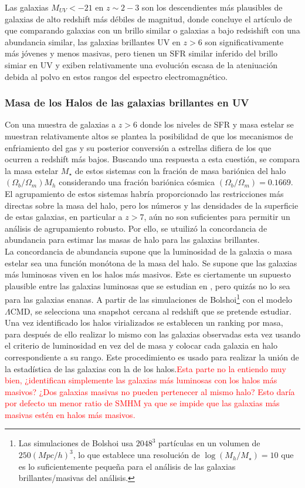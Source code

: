 \documentclass{article}
\begin{document}
Las galaxias $M_{UV}<-21$ en $z\sim 2-3$ son los descendientes más plausibles de galaxias de alto redshift más débiles de magnitud, donde concluye el artículo de \cite{finkelstein2015increasing} que comparando galaxias con un brillo similar o galaxias a bajo redsishift con una abundancia similar, las galaxias brillantes UV en $z>6$ son significativamente más jóvenes y menos masivas, pero tienen un SFR similar inferido del brillo simiar en UV y exiben relativamente una evolución escasa de la ateniuación debida al polvo en estos rangos del espectro electromagnético.\\

\subsubsection*{Masa de los Halos de las galaxias brillantes en UV}
Con una muestra de galaxias a $z>6$ donde los niveles de SFR y masa estelar se muestran relativamente altos se plantea la posibilidad de que los mecanismos de enfriamiento del gas y su posterior conversión a estrellas difiera de los que ocurren a redshift más bajos. Buscando una respuesta a esta cuestión, se compara la masa estelar $M_\star$ de estos sistemas con la fración de masa bariónica del halo $(\Omega_b/\Omega_m)M_h$ considerando una fración bariónica cósmica $(\Omega_b/\Omega_m)=0.1669$. El agrupamiento de estos sistemas habría proporcionado las restricciones más directas sobre la masa del halo, pero los números y las densidades de la superficie de estas galaxias, en particular a $z> 7$, aún no son suficientes para permitir un análisis de agrupamiento robusto. Por ello, se utuilizó la concordancia de abundancia para estimar las masas de halo para las galaxias brillantes. \\

La concordancia de abundancia supone que la luminosidad de la galaxia o masa estelar sea una función monótona de la masa del halo. Se supone que las galaxias más luminosas viven en los halos más masivos. Este es ciertamente un supuesto plausible entre las galaxias luminosas que se estudian en \cite{finkelstein2015increasing}, pero quizás no lo sea para las galaxias enanas. A partir de las simulaciones de Bolshoi\footnote{Las simulaciones de Bolshoi usa $2048^3$ partículas en un volumen de $250 (Mpc/h)^3$, lo que establece una resolución de $\log(M_h/M_\star)=10$ que es lo suficientemente pequeña para el análisis de las galaxias brillantes/masivas del análisis.} con el modelo $\Lambda$CMD, se selecciona una snapshot cercana al redshift que se pretende estudiar. Una vez identificado los halos virializados se establecen un ranking por masa, para después de ello realizar lo mismo con las galaxias observadas esta vez usando el criterio de luminosidad en vez del de masa y colocar cada galaxia en halo correspondiente a su rango. Este procedimiento es usado para realizar la unión de la estadística de las galaxias con la de los halos.\textcolor{red}{Esta parte no la entiendo muy bien, ¿identifican simplemente las galaxias más luminosas con los halos más masivos? ¿Dos galaxias masivas no pueden pertenecer al mismo halo? Esto daría por defecto un menor ratio de SMHM ya que se impide que las galaxias más masivas estén en halos más masivos.}\\
\end{document}
